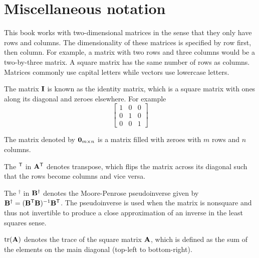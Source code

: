 \section{Miscellaneous notation}

This book works with two-dimensional matrices in the sense that they only have
rows and columns. The dimensionality of these matrices is specified by row
first, then column. For example, a matrix with two rows and three columns would
be a two-by-three matrix. A square matrix has the same number of rows as
columns. Matrices commonly use capital letters while vectors use lowercase
letters.

The matrix $\mathbf{I}$ is known as the identity matrix, which is a square matrix
with ones along its diagonal and zeroes elsewhere. For example
\begin{equation*}
  \begin{bmatrix}
    1 & 0 & 0 \\
    0 & 1 & 0 \\
    0 & 0 & 1
  \end{bmatrix}
\end{equation*}

The matrix denoted by $\mathbf{0}_{m \times n}$ is a matrix filled with zeroes with
$m$ rows and $n$ columns.

The $^\mathsf{T}$ in $\mathbf{A}^\mathsf{T}$ denotes transpose, which flips the matrix across its
diagonal such that the rows become columns and vice versa.

The $^\dagger$ in $\mathbf{B}^\dagger$ denotes the Moore-Penrose pseudoinverse
given by $\mathbf{B}^\dagger = (\mathbf{B}^\mathsf{T}\mathbf{B})^{-1}\mathbf{B}^\mathsf{T}$. The pseudoinverse
is used when the matrix is nonsquare and thus not invertible to produce a close
approximation of an inverse in the least squares sense.

$\operatorname{tr}(\mathbf{A})$ denotes the trace of the square matrix $\mathbf{A}$, which is
defined as the sum of the elements on the main diagonal (top-left to
bottom-right).

